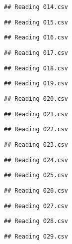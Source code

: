\documentclass[
]{article}
\begin{document}
\begin{verbatim}
## Reading 014.csv
\end{verbatim}

\begin{verbatim}
## Reading 015.csv
\end{verbatim}

\begin{verbatim}
## Reading 016.csv
\end{verbatim}

\begin{verbatim}
## Reading 017.csv
\end{verbatim}

\begin{verbatim}
## Reading 018.csv
\end{verbatim}

\begin{verbatim}
## Reading 019.csv
\end{verbatim}

\begin{verbatim}
## Reading 020.csv
\end{verbatim}

\begin{verbatim}
## Reading 021.csv
\end{verbatim}

\begin{verbatim}
## Reading 022.csv
\end{verbatim}

\begin{verbatim}
## Reading 023.csv
\end{verbatim}

\begin{verbatim}
## Reading 024.csv
\end{verbatim}

\begin{verbatim}
## Reading 025.csv
\end{verbatim}

\begin{verbatim}
## Reading 026.csv
\end{verbatim}

\begin{verbatim}
## Reading 027.csv
\end{verbatim}

\begin{verbatim}
## Reading 028.csv
\end{verbatim}

\begin{verbatim}
## Reading 029.csv
\end{verbatim}
\end{document}
